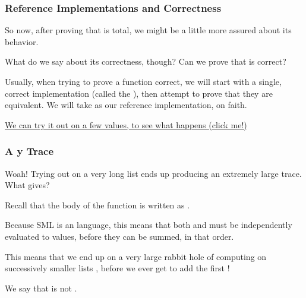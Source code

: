 \documentclass[aspectratio=169]{beamer}
\begin{document}

\begin{frame}[fragile]
  \frametitle{Reference Implementations and Correctness}

  So now, after proving that  is total, we might be a little more assured about its 
  behavior.

  \pause
  \vspace{\fill}

  What do we say about its correctness, though? Can we prove that  is correct?

  \pause
  \vspace{\fill}

  Usually, when trying to prove a function correct, we will start with a single, correct implementation
  (called the ), then attempt to prove that they are equivalent. We will
  take  as our reference implementation, on faith.

  \pause
  \vspace{\fill}

  {\color{blue}\href{https://asciinema.org/a/587202}{We can try it out on a few values, to see what happens (click me!)}}

\end{frame}

\begin{frame}[fragile]
  \frametitle{A y Trace}

  Woah! Trying out  on a very long list ends up producing an extremely large trace.
  What gives? 

  \vspace{\fill}

  Recall that the body of the  function is written as . 
  
  \pause
  \vspace{\fill}

  Because SML is an  language, this means that both  and 
  must be independently evaluated to values, before they can be summed, in that order. 

  \pause
  \vspace{\fill}

  This means that we end up on a very large rabbit hole of computing  on successively
  smaller lists , before we ever get to add the first !

  \pause
  \vspace{\fill}

  We say that  is not .
\end{frame}
\end{document}
